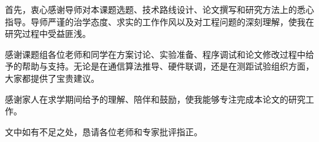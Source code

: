 \begin{acknowledgements}
  首先，衷心感谢导师对本课题选题、技术路线设计、论文撰写和研究方法上的悉心指导。导师严谨的治学态度、求实的工作作风以及对工程问题的深刻理解，使我在研究过程中受益匪浅。

  感谢课题组各位老师和同学在方案讨论、实验准备、程序调试和论文修改过程中给予的帮助与支持。无论是在通信算法推导、硬件联调，还是在测距试验组织方面，大家都提供了宝贵建议。

  感谢家人在求学期间给予的理解、陪伴和鼓励，使我能够专注完成本论文的研究工作。

  文中如有不足之处，恳请各位老师和专家批评指正。

\end{acknowledgements}
